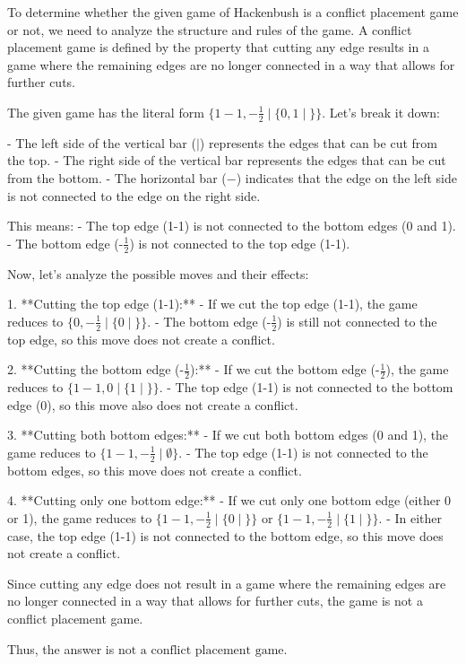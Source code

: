 To determine whether the given game of Hackenbush is a conflict placement game or not, we need to analyze the structure and rules of the game. A conflict placement game is defined by the property that cutting any edge results in a game where the remaining edges are no longer connected in a way that allows for further cuts.

The given game has the literal form \(\{ 1-1, -\frac{1}{2} \mathrel\vert \{ 0, 1 \mathrel\vert \} \}\). Let's break it down:

- The left side of the vertical bar (\(\mathrel\vert\)) represents the edges that can be cut from the top.
- The right side of the vertical bar represents the edges that can be cut from the bottom.
- The horizontal bar (\(-\)) indicates that the edge on the left side is not connected to the edge on the right side.

This means:
- The top edge (1-1) is not connected to the bottom edges (0 and 1).
- The bottom edge (-\(\frac{1}{2}\)) is not connected to the top edge (1-1).

Now, let's analyze the possible moves and their effects:

1. **Cutting the top edge (1-1):**
   - If we cut the top edge (1-1), the game reduces to \(\{ 0, -\frac{1}{2} \mathrel\vert \{ 0 \mathrel\vert \} \}\).
   - The bottom edge (-\(\frac{1}{2}\)) is still not connected to the top edge, so this move does not create a conflict.

2. **Cutting the bottom edge (-\(\frac{1}{2}\)):**
   - If we cut the bottom edge (-\(\frac{1}{2}\)), the game reduces to \(\{ 1-1, 0 \mathrel\vert \{ 1 \mathrel\vert \} \}\).
   - The top edge (1-1) is not connected to the bottom edge (0), so this move also does not create a conflict.

3. **Cutting both bottom edges:**
   - If we cut both bottom edges (0 and 1), the game reduces to \(\{ 1-1, -\frac{1}{2} \mathrel\vert \emptyset \}\).
   - The top edge (1-1) is not connected to the bottom edges, so this move does not create a conflict.

4. **Cutting only one bottom edge:**
   - If we cut only one bottom edge (either 0 or 1), the game reduces to \(\{ 1-1, -\frac{1}{2} \mathrel\vert \{ 0 \mathrel\vert \} \}\) or \(\{ 1-1, -\frac{1}{2} \mathrel\vert \{ 1 \mathrel\vert \} \}\).
   - In either case, the top edge (1-1) is not connected to the bottom edge, so this move does not create a conflict.

Since cutting any edge does not result in a game where the remaining edges are no longer connected in a way that allows for further cuts, the game is not a conflict placement game.

Thus, the answer is \(\boxed{\text{not a conflict placement game}}\).